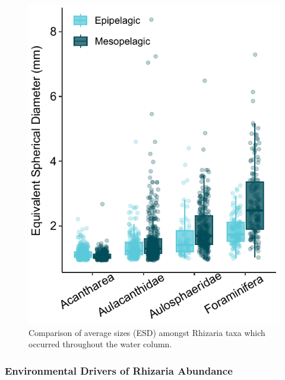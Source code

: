 \documentclass[
]{article}
\begin{document}
\begin{figure}

{\centering \includegraphics{images/09_size-comp.pdf}

}

\caption{Comparison of average sizes (ESD) amongst Rhizaria taxa which
occurred throughout the water column.}

\end{figure}

\hypertarget{environmental-drivers-of-rhizaria-abundance}{%
\subsubsection{Environmental Drivers of Rhizaria
Abundance}\label{environmental-drivers-of-rhizaria-abundance}}
\end{document}
